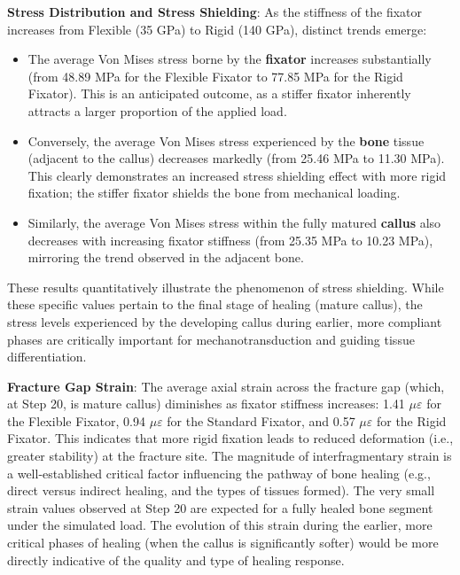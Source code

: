 \documentclass{article}
\begin{document}
\textbf{Stress Distribution and Stress Shielding}:
As the stiffness of the fixator increases from Flexible (35 GPa) to Rigid (140 GPa), distinct trends emerge:
\begin{itemize}
  \item The average Von Mises stress borne by the \textbf{fixator} increases substantially (from 48.89 MPa for the Flexible Fixator to 77.85 MPa for the Rigid Fixator). This is an anticipated outcome, as a stiffer fixator inherently attracts a larger proportion of the applied load.
  \item Conversely, the average Von Mises stress experienced by the \textbf{bone} tissue (adjacent to the callus) decreases markedly (from 25.46 MPa to 11.30 MPa). This clearly demonstrates an increased stress shielding effect with more rigid fixation; the stiffer fixator shields the bone from mechanical loading.
  \item Similarly, the average Von Mises stress within the fully matured \textbf{callus} also decreases with increasing fixator stiffness (from 25.35 MPa to 10.23 MPa), mirroring the trend observed in the adjacent bone.
\end{itemize}
These results quantitatively illustrate the phenomenon of stress shielding. While these specific values pertain to the final stage of healing (mature callus), the stress levels experienced by the developing callus during earlier, more compliant phases are critically important for mechanotransduction and guiding tissue differentiation.

\textbf{Fracture Gap Strain}:
The average axial strain across the fracture gap (which, at Step 20, is mature callus) diminishes as fixator stiffness increases: 1.41 $\mu\varepsilon$ for the Flexible Fixator, 0.94 $\mu\varepsilon$ for the Standard Fixator, and 0.57 $\mu\varepsilon$ for the Rigid Fixator. This indicates that more rigid fixation leads to reduced deformation (i.e., greater stability) at the fracture site. The magnitude of interfragmentary strain is a well-established critical factor influencing the pathway of bone healing (e.g., direct versus indirect healing, and the types of tissues formed). The very small strain values observed at Step 20 are expected for a fully healed bone segment under the simulated load. The evolution of this strain during the earlier, more critical phases of healing (when the callus is significantly softer) would be more directly indicative of the quality and type of healing response.
\end{document}

